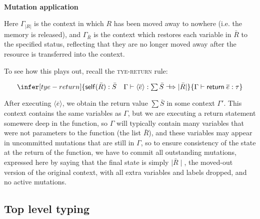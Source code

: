 \documentclass[acmsmall,nonacm]{acmart}
\newcommand{\core}[1]{{\mid}#1{\mid}}
\newcommand{\proves}{\vdash}
\newcommand{\constep}{\Rightarrow}
\newcommand{\makesto}{\dashv\!\constep}
\newcommand{\judgment}[2][]{\noindent\\\textbf{#1}\hspace{\stretch{1}}\fbox{$#2$}\nopagebreak}
\newcommand*{\axiom}[2][]{\infer[#1]{}{#2}}
\begin{document}
\judgment[Mutation application]{\Gamma \constep\Gamma'}
Here $\Gamma_{|R|}$ is the context in which $R$ has been moved away to nowhere (i.e. the memory is released), and $\Gamma_{\bar R}$ is the context which restores each variable in $\bar R$ to the specified status, reflecting that they are no longer moved away after the resource is transferred into the context.

To see how this plays out, recall the \textsc{tye-return} rule:

$$\infer[tye-return]
    {\mathsf{self}(\bar R):\bar S\quad
      \Gamma \proves \langle\overline{e}\rangle:\textstyle\sum\bar S\makesto \core{\bar R}}
    {\Gamma \proves \mathsf{return}\;\overline{e}:\tau}$$

After executing $\langle\overline{e}\rangle$, we obtain the return value $\sum\bar S$ in some context $\Gamma'$. This context contains the same variables as $\Gamma$, but we are executing a return statement somewere deep in the function, so $\Gamma$ will typically contain many variables that were not parameters to the function (the list $\bar R$), and these variables may appear in uncommitted mutations that are still in $\Gamma$, so to ensure consistency of the state at the return of the function, we have to commit all outstanding mutations, expressed here by saying that the final state is simply $\core{\bar R}$, the moved-out version of the original context, with all extra variables and labels dropped, and no active mutations.

\subsection{Top level typing}
\end{document}
